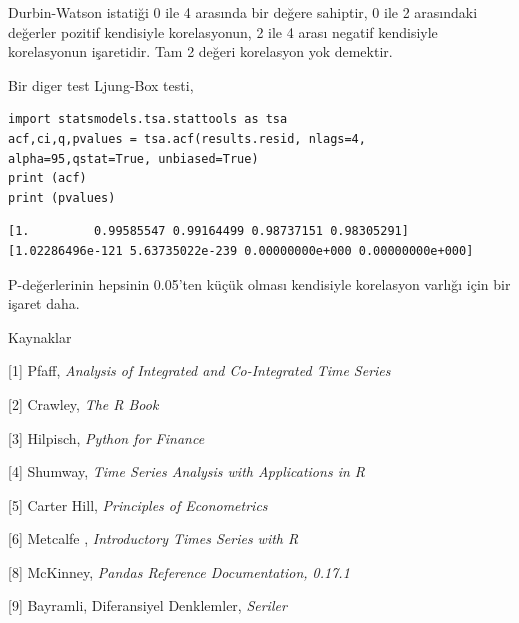 \documentclass[12pt,fleqn]{article}\usepackage{../../common}
\begin{document}
Durbin-Watson istatiği 0 ile 4 arasında bir değere sahiptir, 0 ile 2 arasındaki
değerler pozitif kendisiyle korelasyonun, 2 ile 4 arası negatif kendisiyle
korelasyonun işaretidir. Tam 2 değeri korelasyon yok demektir.

Bir diger test Ljung-Box testi, 

\begin{verbatim}
import statsmodels.tsa.stattools as tsa
acf,ci,q,pvalues = tsa.acf(results.resid, nlags=4, alpha=95,qstat=True, unbiased=True)
print (acf)
print (pvalues)
\end{verbatim}

\begin{verbatim}
[1.         0.99585547 0.99164499 0.98737151 0.98305291]
[1.02286496e-121 5.63735022e-239 0.00000000e+000 0.00000000e+000]
\end{verbatim}

P-değerlerinin hepsinin 0.05'ten küçük olması kendisiyle korelasyon varlığı
için bir işaret daha.

Kaynaklar

[1] Pfaff, {\em Analysis of Integrated and Co-Integrated Time Series}

[2] Crawley, {\em The R Book}

[3] Hilpisch, {\em Python for Finance}

[4] Shumway, {\em Time Series Analysis with Applications in R}

[5] Carter Hill, {\em Principles of Econometrics}

[6] Metcalfe , {\em Introductory Times Series with R}

[8] McKinney, {\em Pandas Reference Documentation, 0.17.1}

[9] Bayramli, Diferansiyel Denklemler, {\em Seriler}
\end{document}
